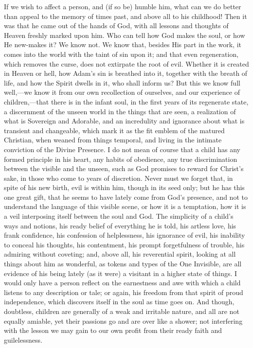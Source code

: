 If we wish to affect a person, and (if so be) humble him, what can
we do better than appeal to the memory of times past, and above all to
his childhood! Then it was that he came out of the hands of God, with
all lessons and thoughts of Heaven freshly marked upon him. Who can
tell how God makes the soul, or how He new-makes it? We know not. We
know that, besides His part in the work, it comes into the world with
the taint of sin upon it; and that even regeneration, which removes
the curse, does not extirpate the root of evil. Whether it is created
in Heaven or hell, how Adam's sin is breathed into it, together with
the breath of life, and how the Spirit dwells in it, who shall inform
us? But this we know full well,—we know it from our own recollection
of ourselves, and our experience of children,—that there is in the
infant soul, in the first years of its regenerate state, a discernment
of the unseen world in the things that are seen, a realization of what
is Sovereign and Adorable, and an incredulity and ignorance about what
is transient and changeable, which mark it as the fit emblem of the
matured Christian, when weaned from things temporal, and living in the
intimate conviction of the Divine Presence. I do not mean of course
that a child has any formed principle in his heart, any habits of
obedience, any true discrimination between the visible and the unseen,
such as God promises to reward for Christ's sake, in those who come to
years of discretion. Never must we forget that, in spite of his new
birth, evil is within him, though in its seed only; but he has this
one great gift, that he seems to have lately come from God's presence,
and not to understand the language of this visible scene, or how it is
a temptation, how it is a veil interposing itself between the soul and
God. The simplicity of a child's ways and notions, his ready belief of
everything he is told, his artless love, his frank confidence, his
confession of helplessness, his ignorance of evil, his inability to
conceal his thoughts, his contentment, his prompt forgetfulness of
trouble, his admiring without coveting; and, above all, his
reverential spirit, looking at all things about him as wonderful, as
tokens and types of the One Invisible, are all evidence of his being
lately (as it were) a visitant in a higher state of things. I would
only have a person reflect on the earnestness and awe with which a
child listens to any description or tale; or again, his freedom from
that spirit of proud independence, which discovers itself in the soul
as time goes on. And though, doubtless, children are generally of a
weak and irritable nature, and all are not equally amiable, yet their
passions go and are over like a shower; not interfering with the
lesson we may gain to our own profit from their ready faith and
guilelessness.


